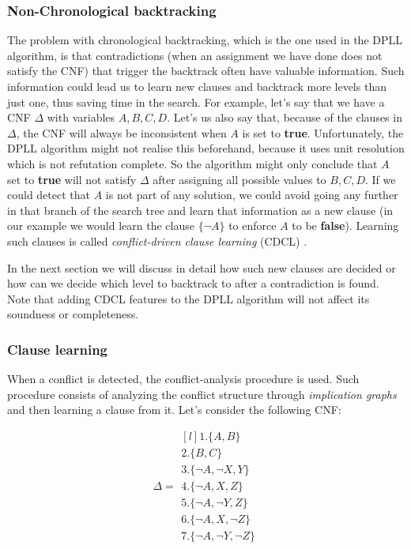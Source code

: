\documentclass[12pt]{diicc}
\begin{document}
\subsubsection{Non-Chronological backtracking}

The problem with chronological backtracking, which is the one used in the DPLL algorithm, is that contradictions (when an assignment we have done does not satisfy the CNF) that trigger the backtrack often have valuable information. Such information could lead us to learn new clauses and backtrack more levels than just one, thus saving time in the search. For example, let's say that we have a CNF $\Delta$ with variables $A,B,C,D$. Let's us also say that, because of the clauses in $\Delta$, the CNF will always be inconsistent when $A$ is set to \textbf{true}. Unfortunately, the DPLL algorithm might not realise this beforehand, because it uses unit resolution which is not refutation complete. So the algorithm might only conclude that $A$ set to \textbf{true} will not satisfy $\Delta$ after assigning all possible values to $B,C,D$. If we could detect that $A$ is not part of any solution, we could avoid going any further in that branch of the search tree and learn that information as a new clause (in our example we would learn the clause $\{\neg A\}$ to enforce $A$ to be \textbf{false}). Learning such clauses is called \textit{conflict-driven clause learning} (CDCL) \cite{cdcl1,cdcl2}.

In the next section we will discuss in detail how such new clauses are decided or how can we decide which level to backtrack to after a contradiction is found. Note that adding CDCL features to the DPLL algorithm will not affect its soundness or completeness.

\subsubsection{Clause learning}

When a conflict is detected, the conflict-analysis procedure is used. Such procedure consists of analyzing the conflict structure through \textit{implication graphs} and then learning a clause from it. Let's consider the following CNF:

\begin{equation}\label{row sum}
\Delta = \begin{matrix*}[l]
			1.\{A,B\}\\
		 	2.\{B,C\}\\
		 	3.\{\neg A,\neg X,Y\}\\
		 	4.\{\neg A,X,Z\}\\
		 	5.\{\neg A,\neg Y,Z\}\\
		 	6.\{\neg A,X,\neg Z\}\\
		 	7.\{\neg A,\neg Y,\neg Z\}
		 \end{matrix*}
\end{equation}
\end{document}
